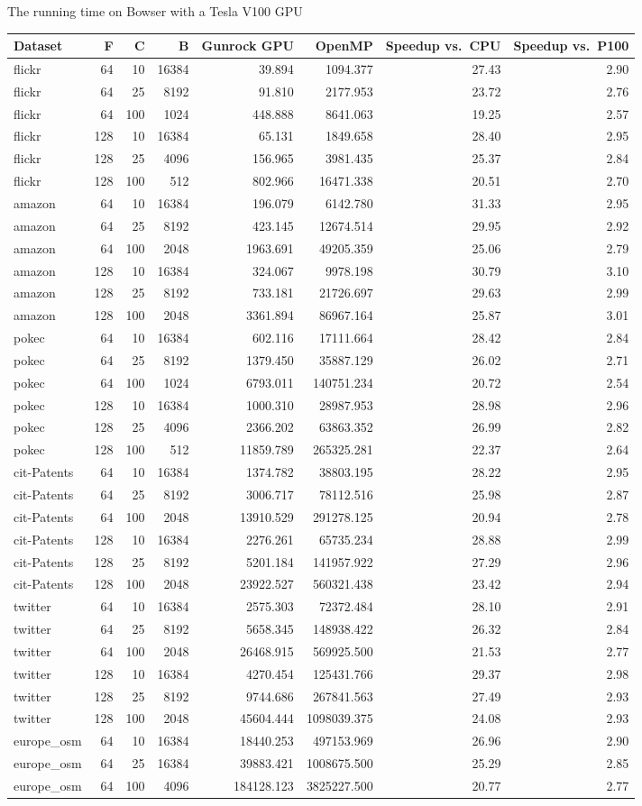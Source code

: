 \documentclass[10pt,oneside]{memoir}
\begin{document}
The running time on Bowser with a Tesla V100 GPU

\begin{longtable}[]{@{}lrrrrrrr@{}}
\toprule
Dataset & F & C & B & Gunrock GPU & OpenMP & Speedup vs.~CPU & Speedup
vs.~P100\tabularnewline
\midrule
\endhead
flickr & 64 & 10 & 16384 & 39.894 & 1094.377 & 27.43 &
2.90\tabularnewline
flickr & 64 & 25 & 8192 & 91.810 & 2177.953 & 23.72 &
2.76\tabularnewline
flickr & 64 & 100 & 1024 & 448.888 & 8641.063 & 19.25 &
2.57\tabularnewline
flickr & 128 & 10 & 16384 & 65.131 & 1849.658 & 28.40 &
2.95\tabularnewline
flickr & 128 & 25 & 4096 & 156.965 & 3981.435 & 25.37 &
2.84\tabularnewline
flickr & 128 & 100 & 512 & 802.966 & 16471.338 & 20.51 &
2.70\tabularnewline
amazon & 64 & 10 & 16384 & 196.079 & 6142.780 & 31.33 &
2.95\tabularnewline
amazon & 64 & 25 & 8192 & 423.145 & 12674.514 & 29.95 &
2.92\tabularnewline
amazon & 64 & 100 & 2048 & 1963.691 & 49205.359 & 25.06 &
2.79\tabularnewline
amazon & 128 & 10 & 16384 & 324.067 & 9978.198 & 30.79 &
3.10\tabularnewline
amazon & 128 & 25 & 8192 & 733.181 & 21726.697 & 29.63 &
2.99\tabularnewline
amazon & 128 & 100 & 2048 & 3361.894 & 86967.164 & 25.87 &
3.01\tabularnewline
pokec & 64 & 10 & 16384 & 602.116 & 17111.664 & 28.42 &
2.84\tabularnewline
pokec & 64 & 25 & 8192 & 1379.450 & 35887.129 & 26.02 &
2.71\tabularnewline
pokec & 64 & 100 & 1024 & 6793.011 & 140751.234 & 20.72 &
2.54\tabularnewline
pokec & 128 & 10 & 16384 & 1000.310 & 28987.953 & 28.98 &
2.96\tabularnewline
pokec & 128 & 25 & 4096 & 2366.202 & 63863.352 & 26.99 &
2.82\tabularnewline
pokec & 128 & 100 & 512 & 11859.789 & 265325.281 & 22.37 &
2.64\tabularnewline
cit-Patents & 64 & 10 & 16384 & 1374.782 & 38803.195 & 28.22 &
2.95\tabularnewline
cit-Patents & 64 & 25 & 8192 & 3006.717 & 78112.516 & 25.98 &
2.87\tabularnewline
cit-Patents & 64 & 100 & 2048 & 13910.529 & 291278.125 & 20.94 &
2.78\tabularnewline
cit-Patents & 128 & 10 & 16384 & 2276.261 & 65735.234 & 28.88 &
2.99\tabularnewline
cit-Patents & 128 & 25 & 8192 & 5201.184 & 141957.922 & 27.29 &
2.96\tabularnewline
cit-Patents & 128 & 100 & 2048 & 23922.527 & 560321.438 & 23.42 &
2.94\tabularnewline
twitter & 64 & 10 & 16384 & 2575.303 & 72372.484 & 28.10 &
2.91\tabularnewline
twitter & 64 & 25 & 8192 & 5658.345 & 148938.422 & 26.32 &
2.84\tabularnewline
twitter & 64 & 100 & 2048 & 26468.915 & 569925.500 & 21.53 &
2.77\tabularnewline
twitter & 128 & 10 & 16384 & 4270.454 & 125431.766 & 29.37 &
2.98\tabularnewline
twitter & 128 & 25 & 8192 & 9744.686 & 267841.563 & 27.49 &
2.93\tabularnewline
twitter & 128 & 100 & 2048 & 45604.444 & 1098039.375 & 24.08 &
2.93\tabularnewline
europe\_osm & 64 & 10 & 16384 & 18440.253 & 497153.969 & 26.96 &
2.90\tabularnewline
europe\_osm & 64 & 25 & 16384 & 39883.421 & 1008675.500 & 25.29 &
2.85\tabularnewline
europe\_osm & 64 & 100 & 4096 & 184128.123 & 3825227.500 & 20.77 &
2.77\tabularnewline
\bottomrule
\end{longtable}
\end{document}
